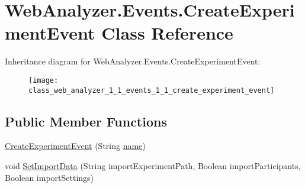 \hypertarget{class_web_analyzer_1_1_events_1_1_create_experiment_event}{}\section{Web\+Analyzer.\+Events.\+Create\+Experiment\+Event Class Reference}
\label{class_web_analyzer_1_1_events_1_1_create_experiment_event}
Inheritance diagram for Web\+Analyzer.\+Events.\+Create\+Experiment\+Event\+:\begin{figure}[H]
\begin{center}
\leavevmode
\texttt{[image: class\_web\_analyzer\_1\_1\_events\_1\_1\_create\_experiment\_event]}
\end{center}
\end{figure}
\subsection*{Public Member Functions}
\begin{DoxyCompactItemize}
\item 
\hyperlink{class_web_analyzer_1_1_events_1_1_create_experiment_event_a5f3b337a20585c39e7e0470429807d23}{Create\+Experiment\+Event} (String \hyperlink{_u_i_2_h_t_m_l_resources_2js_2src_2create__experiment_8js_adac2bcb4f01b574cbc63fe8ee2c56bf0}{name})
\item 
void \hyperlink{class_web_analyzer_1_1_events_1_1_create_experiment_event_a4b2a92153369ad87f92fd19b1ae8398a}{Set\+Import\+Data} (String import\+Experiment\+Path, Boolean import\+Participants, Boolean import\+Settings)
\end{DoxyCompactItemize}
